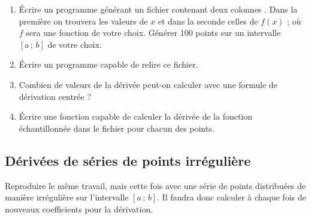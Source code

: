 \begin{enumerate}
\item Écrire un programme générant un fichier contenant deux colonnes . Dans la première
on trouvera les valeurs de $x$ et dans la seconde celles de $f(x)$ ; où $f$ sera une fonction de votre choix. Générer 100 points sur un intervalle $[a\,;\,b]$ de votre choix. 
\item Écrire un programme capable de relire ce fichier.
\item Combien de valeurs de la dérivée peut-on calculer avec une formule de dérivation centrée ? 
\item Écrire une fonction capable de calculer la dérivée de la fonction échantillonnée dans le fichier pour chacun des points.
\end{enumerate}

\subsection{Dérivées de séries de points irrégulière}
Reproduire le même travail, mais cette fois avec une série de points distribuées de manière irrégulière sur l'intervalle $[a\,;\,b]$. Il faudra donc calculer à chaque fois de nouveaux coefficients pour la dérivation. 